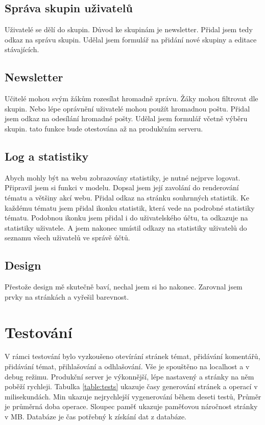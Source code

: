 \documentclass[thesis=B,czech]{FITthesis}[2012/06/26]
\begin{document}
\subsection{Správa skupin uživatelů}

Uživatelé se dělí do skupin. Důvod ke skupinám je newsletter. Přidal jsem tedy  odkaz na správu skupin. Udělal jsem formulář na přidání nové skupiny a editace stávajících.

\subsection{Newsletter}

Učitelé mohou svým žákům rozesílat hromadně zprávu. Žáky mohou filtrovat dle skupin. Nebo lépe oprávnění uživatelé mohou použít hromadnou poštu. Přidal jsem odkaz na odesílání hromadné pošty. Udělal jsem formulář včetně výběru skupin. tato funkce bude otestována až na produkčním serveru.

\subsection{Log a statistiky}

Abych mohly být na webu zobrazovány statistiky, je nutné nejprve logovat. Připravil jsem si funkci v modelu. Dopsal jsem její zavolání do renderování tématu a většiny akcí webu. Přidal odkaz na stránku souhrnných statistik. Ke každému tématu jsem přidal ikonku statistik, která vede na podrobné statistiky tématu. Podobnou ikonku jsem přidal i do uživatelského účtu, ta odkazuje na statistiky uživatele. A jsem nakonec umístil odkazy na statistiky uživatelů do seznamu všech uživatelů ve správě účtů.

\subsection{Design}

Přestože design mě skutečně baví, nechal jsem si ho nakonec. Zarovnal jsem prvky na stránkách a vyřešil barevnost.

\section{Testování}

V rámci testování bylo vyzkoušeno otevírání stránek témat, přidávání komentářů, přidávání témat, přihlašování a odhlašování. Vše je spouštěno na localhost a v debug režimu. Produkční server je výkonnější, lépe nastavený a stránky na něm poběží rychleji. Tabulka \ref{table:tests} ukazuje časy generování stránek a operací v milisekundách. Min ukazuje nejrychlejší vygenerování během deseti testů, Průměr je průměrná doba operace. Sloupec paměť ukazuje paměťovou náročnost stránky v MB. Databáze je čas potřebný k získání dat z databáze.
\end{document}
